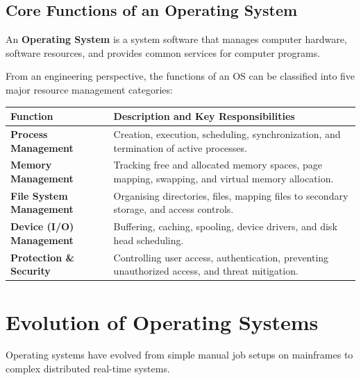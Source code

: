 \documentclass[12pt,a4paper]{article}
\begin{document}
\subsection{Core Functions of an Operating System}

\begin{tcolorbox}[defbox, title={\textbf{Definition: Operating System}}]
An \textbf{Operating System} is a system software that manages computer hardware, software resources, and provides common services for computer programs.
\end{tcolorbox}

From an engineering perspective, the functions of an OS can be classified into five major resource management categories:\par\noindent
\begin{tabularx}{\linewidth}{|B{3.2cm}|Y|}
\hline
\textbf{Function} & \textbf{\color{myteal}Description and Key Responsibilities} \\
\hline
\textbf{Process Management} & Creation, execution, scheduling, synchronization, and termination of active processes. \\
\hline
\textbf{Memory Management} & Tracking free and allocated memory spaces, page mapping, swapping, and virtual memory allocation. \\
\hline
\textbf{File System Management} & Organising directories, files, mapping files to secondary storage, and access controls. \\
\hline
\textbf{Device (I/O) Management} & Buffering, caching, spooling, device drivers, and disk head scheduling. \\
\hline
\textbf{Protection \& Security} & Controlling user access, authentication, preventing unauthorized access, and threat mitigation. \\
\hline
\end{tabularx}

\section{Evolution of Operating Systems}

Operating systems have evolved from simple manual job setups on mainframes to complex distributed real-time systems.
\end{document}
